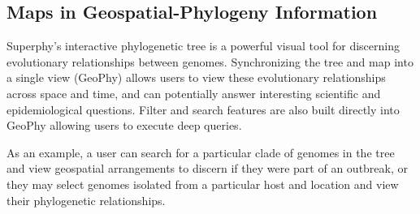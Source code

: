 \documentclass{bmcart}
\begin{document}
\subsection{Maps in Geospatial-Phylogeny Information}
Superphy's interactive phylogenetic tree is a powerful visual tool for discerning evolutionary relationships between genomes. Synchronizing the tree and map into a single view (GeoPhy) allows users to view these evolutionary relationships across space and time, and can potentially answer interesting scientific and epidemiological questions. Filter and search features are also built directly into GeoPhy allowing users to execute deep queries.

As an example, a user can search for a particular clade of genomes in the tree and view geospatial arrangements to discern if they were part of an outbreak, or they may select genomes isolated from a particular host and location and view their phylogenetic relationships.


\end{document}
